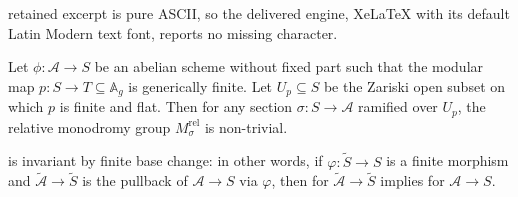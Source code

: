 \documentclass[10pt,a4paper]{amsart}
\newcommand{\cA}{\mathcal A}
\begin{document}
retained excerpt is pure ASCII, so the delivered engine, XeLaTeX with its default Latin Modern text font, reports no missing character.
\begin{thm}\label{mainThm1}
    Let $\phi:\mathcal A \to S$ be an abelian scheme without fixed part such that the modular map $p:S \to T \subseteq \mathbb A_g$ is generically  finite. Let $U_p\subseteq S$ be the Zariski open subset on which $p$ is finite and flat. Then for any section $\sigma\colon S\to \mathcal A$  ramified over $U_p$, the relative monodromy group $M_\sigma^{\textrm{rel}}$ is non-trivial.
\end{thm}

\begin{lem}\label{baseChange}
	 is invariant by finite base change: in other words, if $\varphi: \widetilde{S} \rightarrow S$ is a finite morphism and $\widetilde{\cA} \to \widetilde{S}$ is the pullback of $\cA\rightarrow S$ via $\varphi$, then   for $\widetilde{\cA} \rightarrow \widetilde{S}$ implies   for $\cA \rightarrow S$.
\end{lem}
\end{document}
